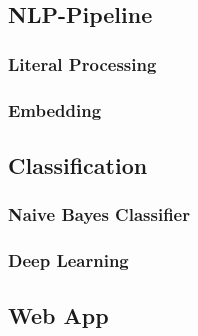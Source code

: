 \subsection{NLP-Pipeline}
\subsubsection{Literal Processing}
\subsubsection{Embedding}

\subsection{Classification}
\subsubsection{Naive Bayes Classifier}
\subsubsection{Deep Learning}

\subsection{Web App}
